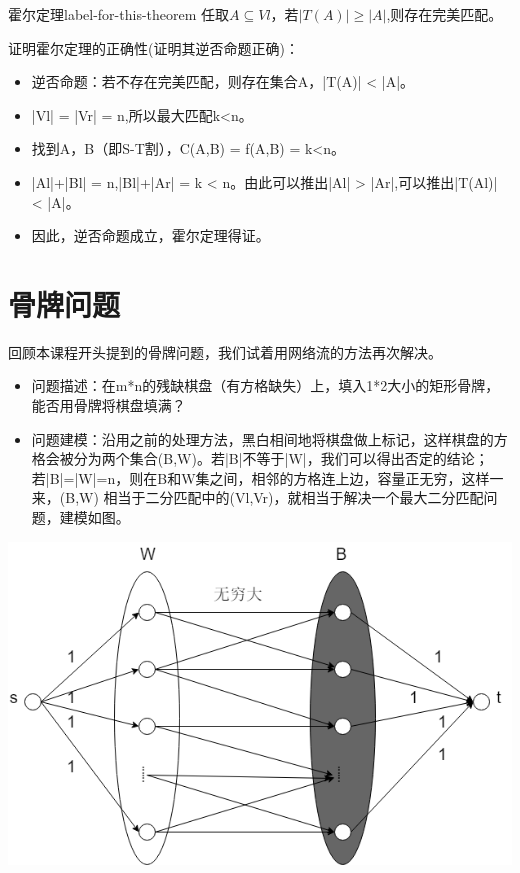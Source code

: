 \begin{theorem}{霍尔定理}{label-for-this-theorem}
    任取\(A\subseteq Vl，若|T(A)| \geq |A|\),则存在完美匹配。
\end{theorem}
证明霍尔定理的正确性(证明其逆否命题正确)：
\begin{itemize}
  \item 逆否命题：若不存在完美匹配，则存在集合A，|T(A)| < |A|。
  \item |Vl| = |Vr| = n,所以最大匹配k<n。
  \item 找到A，B（即S-T割），C(A,B) = f(A,B) = k<n。
  \item |Al|+|Bl| = n,|Bl|+|Ar| = k < n。由此可以推出|Al| > |Ar|,可以推出|T(Al)| < |A|。
  \item 因此，逆否命题成立，霍尔定理得证。
\end{itemize}

\section{骨牌问题}
回顾本课程开头提到的骨牌问题，我们试着用网络流的方法再次解决。

\begin{itemize}
  \item 问题描述：在m*n的残缺棋盘（有方格缺失）上，填入1*2大小的矩形骨牌，能否用骨牌将棋盘填满？

  \item 问题建模：沿用之前的处理方法，黑白相间地将棋盘做上标记，这样棋盘的方格会被分为两个集合(B,W)。若|B|不等于|W|，我们可以得出否定的结论；若|B|=|W|=n，则在B和W集之间，相邻的方格连上边，容量正无穷，这样一来，(B,W) 相当于二分匹配中的(Vl,Vr)，就相当于解决一个最大二分匹配问题，建模如图。

\end{itemize}
\centerline{\includegraphics[scale=0.6]{Ln11.image/networkflow4.png}}

